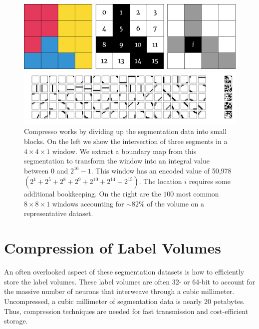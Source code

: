\begin{figure}[t]
	\begin{center}
		\begin{minipage}{0.48\linewidth}
			\centering
			\includegraphics[width=0.9\linewidth]{./figures/encoding_diagram_opt.pdf}
		\end{minipage}
		\begin{minipage}{0.48\linewidth}
			\centering
			\includegraphics[width=0.9\linewidth]{./figures/window_values.pdf}
		\end{minipage}
	\end{center}	
	\caption{Compresso works by dividing up the segmentation data into small blocks. On the left we show the intersection of three segments in a $4\times4\times1$ window. We extract a boundary map from this segmentation to transform the window into an integral value between $0$ and $2^{16} - 1$. This window has an encoded value of 50,978 $(2^1 + 2^5 + 2^8 + 2^9 + 2^{10} + 2^{14} + 2^{15})$. The location $i$ requires some additional bookkeeping. On the right are the $100$ most common $8 \times 8 \times 1$ windows accounting for $\sim82\%$ of the volume on a representative dataset.}
	\label{fig:compression}
\end{figure}

\section{Compression of Label Volumes}

An often overlooked aspect of these segmentation datasets is how to efficiently store the label volumes.
These label volumes are often 32- or 64-bit to account for the massive number of neurons that interweave through a cubic millimeter.
Uncompressed, a cubic millimeter of segmentation data is nearly 20 petabytes.
Thus, compression techniques are needed for fast transmission and cost-efficient storage.

